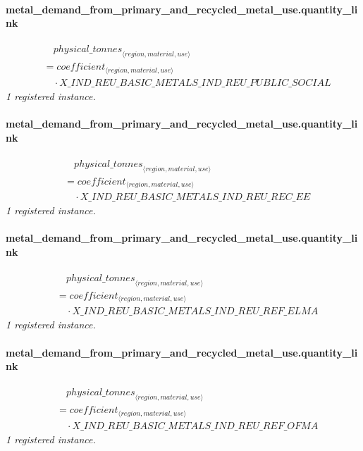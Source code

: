 \documentclass[11pt]{article}
\begin{document}
\paragraph{metal\_demand\_from\_primary\_and\_recycled\_metal\_use.quantity\_link}
\begin{align*}
&\quad {physical\_tonnes}_{\langle region, material, use\rangle}\\
&= coefficient_{\langle region, material, use\rangle}\\
&\quad {}\cdot X\_IND\_REU\_BASIC\_METALS\_IND\_REU\_PUBLIC\_SOCIAL
\end{align*}
\noindent\emph{1 registered instance.}\par
\paragraph{metal\_demand\_from\_primary\_and\_recycled\_metal\_use.quantity\_link}
\begin{align*}
&\quad {physical\_tonnes}_{\langle region, material, use\rangle}\\
&= coefficient_{\langle region, material, use\rangle}\\
&\quad {}\cdot X\_IND\_REU\_BASIC\_METALS\_IND\_REU\_REC\_EE
\end{align*}
\noindent\emph{1 registered instance.}\par
\paragraph{metal\_demand\_from\_primary\_and\_recycled\_metal\_use.quantity\_link}
\begin{align*}
&\quad {physical\_tonnes}_{\langle region, material, use\rangle}\\
&= coefficient_{\langle region, material, use\rangle}\\
&\quad {}\cdot X\_IND\_REU\_BASIC\_METALS\_IND\_REU\_REF\_ELMA
\end{align*}
\noindent\emph{1 registered instance.}\par
\paragraph{metal\_demand\_from\_primary\_and\_recycled\_metal\_use.quantity\_link}
\begin{align*}
&\quad {physical\_tonnes}_{\langle region, material, use\rangle}\\
&= coefficient_{\langle region, material, use\rangle}\\
&\quad {}\cdot X\_IND\_REU\_BASIC\_METALS\_IND\_REU\_REF\_OFMA
\end{align*}
\noindent\emph{1 registered instance.}\par
\end{document}
